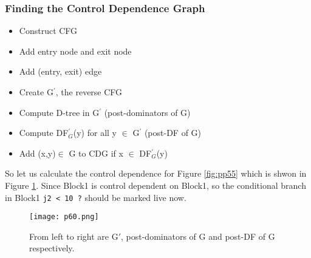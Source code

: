 \subsubsection{Finding the Control Dependence Graph}

\begin{itemize}
\item Construct CFG
\item Add entry node and exit node 
\item Add (entry, exit) edge 
\item Create G$^\prime$, the reverse CFG 
\item Compute D-tree in G$^\prime$ (post-dominators of G)
\item Compute DF$_G^\prime$(y) for all y $\in$ G$^\prime$ (post-DF of G)
\item Add (x,y)$\in$ G to CDG if x $\in$ DF$_G^\prime$(y)
\end{itemize}



So let us calculate the control dependence for Figure \ref{fig:pp55} which is shwon in Figure \ref{fig:p60}. Since Block1 is control dependent on Block1, so the conditional 
branch in Block1 \texttt{j2 < 10 ?} should be marked live now. 

\begin{figure}[H]
    \centering
     \texttt{[image: p60.png]}
         \caption{From left to right are G$\prime$, post-dominators of G and post-DF of G respectively.}
         \label{fig:p60}
\end{figure}



